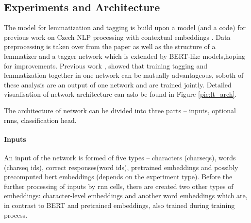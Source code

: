 \subsection{Experiments and Architecture}





The model for lemmatization and tagging is build upon a model (and a code) for previous work on Czech NLP processing with contextual embeddings \citep{straka2019czech}. Data preprocessing is taken over from the paper as well as the structure of a lemmatizer and a tagger network which is extended by BERT-like models,hoping for improvements. Previous work \citep{Straka2019}, \citep{Straka2018} showed that training tagging and lemmatization together in one network can be mutually advantageous, soboth of these analysis are an output of one network and are trained jointly. Detailed visualisation of network architecture can aslo be found in Figure \ref{pic:lt_arch}. \par
The architecture of network can be divided into three parts -- inputs, optional \acrshort{rnn}s, classification head.
\paragraph{Inputs}
An input of the network is formed of five types -- characters (charseqs), words (charseq ids), correct responses(word ids), pretrained embeddings and possibly precomputed bert embeddings (depends on the experiment type). Before the further processing of inputs by \acrshort{rnn} cells, there are created two other types of embeddings: character-level embeddings and another word embeddings which are, in contrast to BERT and pretrained embeddings, also trained during training process.


